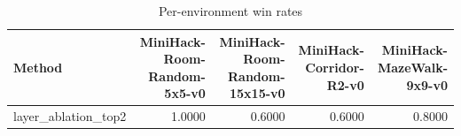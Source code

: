 \begin{table}[htbp]
\centering
\caption{Per-environment win rates}
\label{tab:per-env}
\begin{tabular}{lrrrr}
\toprule
\textbf{Method} & \textbf{MiniHack-Room-Random-5x5-v0} & \textbf{MiniHack-Room-Random-15x15-v0} & \textbf{MiniHack-Corridor-R2-v0} & \textbf{MiniHack-MazeWalk-9x9-v0} \\
\midrule
layer\_ablation\_top2 & 1.0000 & 0.6000 & 0.6000 & 0.8000 \\
\bottomrule
\end{tabular}
\end{table}